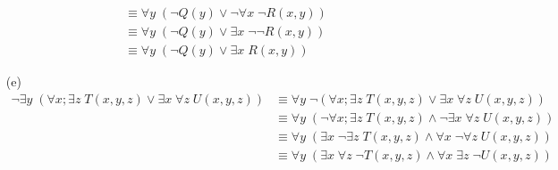 \documentclass[12pt,addpoints]{exam}
\begin{document}
\begin{questions}
\begin{solution}
\begin{itemize}
\begin{align*}
          & \equiv \forall y\; (\neg Q(y) \vee \neg \forall x\; \neg R(x,y)) \\
          & \equiv \forall y\; (\neg Q(y) \vee \exists x\; \neg \neg R(x,y))\\
          & \equiv \forall y\; (\neg Q(y) \vee \exists x\; R(x,y))
        \end{align*}
        \item[(e)]
        \begin{align*}
          \neg \exists y\; (\forall x; \exists z\; T(x,y,z) \vee \exists x\; \forall z\; U(x,y,z)) & \equiv \forall y\; \neg (\forall x; \exists z\; T(x,y,z) \vee \exists x\; \forall z\; U(x,y,z)) \\
          & \equiv \forall y\; (\neg \forall x; \exists z\; T(x,y,z) \wedge \neg \exists x\; \forall z\; U(x,y,z)) \\
          & \equiv \forall y\; (\exists x\; \neg \exists z\; T(x,y,z) \wedge \forall x\; \neg \forall z\; U(x,y,z)) \\
          & \equiv \forall y\; (\exists x\; \forall z\; \neg T(x,y,z) \wedge \forall x\; \exists z\; \neg U(x,y,z))
        \end{align*}
        \end{itemize}
    \end{solution}



\end{questions}
\end{document}
